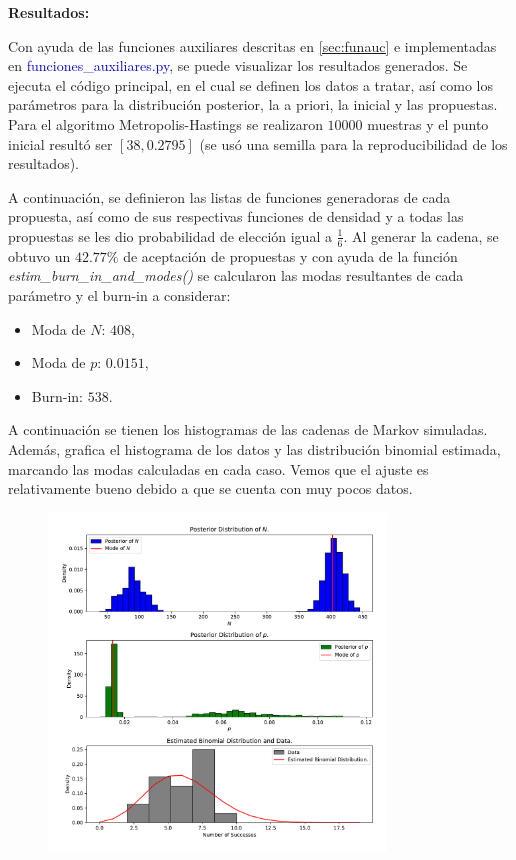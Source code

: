 \textbf{Resultados:}

Con ayuda de las funciones auxiliares descritas en \ref{sec:funauc} e implementadas en \textcolor{mediumblue}{funciones\_auxiliares.py}, se puede visualizar los resultados generados. Se ejecuta el código principal, en el cual se definen los datos a tratar, así como los parámetros para la distribución posterior, la a priori, la inicial y las propuestas. Para el algoritmo Metropolis-Hastings se realizaron $10000$ muestras y el punto inicial resultó ser $[38, 0.2795]$ (se usó una semilla para la reproducibilidad de los resultados).

A continuación, se definieron las listas de funciones generadoras de cada propuesta, así como de sus respectivas funciones de densidad y a todas las propuestas se les dio probabilidad de elección igual a $\frac{1}{6}$. Al generar la cadena, se obtuvo un $42.77\%$ de aceptación de propuestas y con ayuda de la función \textit{estim\_burn\_in\_and\_modes()} se calcularon las modas resultantes de cada parámetro y el burn-in a considerar:
\begin{itemize}
	\item Moda de $N$: $408$,
	\item Moda de $p$: $0.0151$,
	\item Burn-in: $538$.
\end{itemize}

A continuación se tienen los histogramas de las cadenas de Markov simuladas. Además, grafica el histograma de los datos y las
distribución binomial estimada, marcando las modas calculadas en cada caso. Vemos que el ajuste es relativamente bueno debido a que se cuenta con muy pocos datos.
\begin{figure}[h!]
	\centering
	\includegraphics[width=0.8\textwidth]{IMAGENES/histogram_ex1.pdf}
\end{figure}

